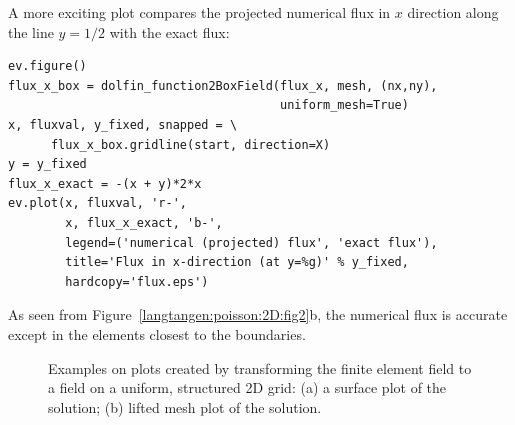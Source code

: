 A more exciting plot compares the projected numerical flux in
$x$ direction along the
line $y=1/2$ with the exact flux:
\begin{Verbatim}[fontsize=\fontsize{10pt}{10pt},tabsize=8,baselinestretch=1.05,
fontfamily=tt,xleftmargin=7mm]
ev.figure()
flux_x_box = dolfin_function2BoxField(flux_x, mesh, (nx,ny),
                                      uniform_mesh=True)
x, fluxval, y_fixed, snapped = \
      flux_x_box.gridline(start, direction=X)
y = y_fixed
flux_x_exact = -(x + y)*2*x
ev.plot(x, fluxval, 'r-',
        x, flux_x_exact, 'b-',
        legend=('numerical (projected) flux', 'exact flux'),
        title='Flux in x-direction (at y=%g)' % y_fixed,
        hardcopy='flux.eps')
\end{Verbatim}
\noindent
As seen from Figure~\ref{langtangen:poisson:2D:fig2}b, the numerical flux
is accurate except in the elements closest to the boundaries.

\begin{figure}
  \centerline{
}
  \centerline{
}
  \caption{\label{langtangen:poisson:2D:fig3}
  Examples on plots created by transforming the finite element field to
  a field on a uniform, structured 2D grid:
  (a) a surface plot of the solution; (b) lifted mesh plot of the solution.
  }
\end{figure}


